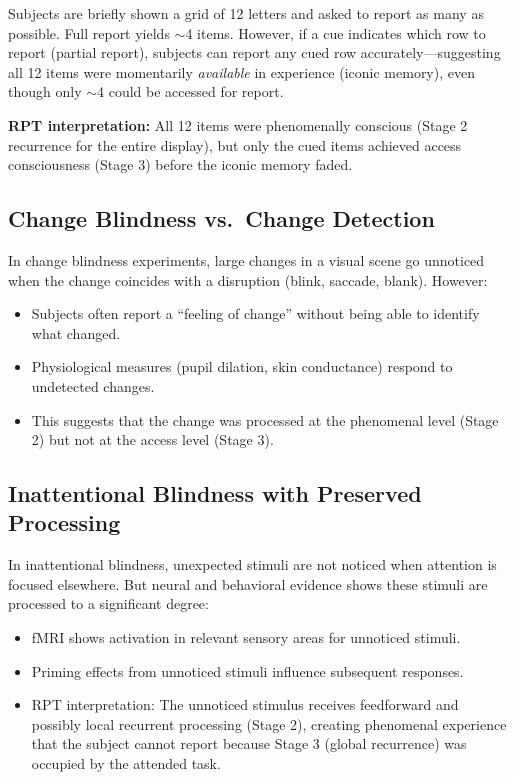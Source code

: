 \documentclass[11pt,a4paper]{report}
\begin{document}
\begin{examplebox}
Subjects are briefly shown a grid of 12 letters and asked to report as many as possible. Full report yields $\sim$4 items. However, if a cue indicates which row to report (partial report), subjects can report any cued row accurately---suggesting all 12 items were momentarily \emph{available} in experience (iconic memory), even though only $\sim$4 could be accessed for report.

\textbf{RPT interpretation:} All 12 items were phenomenally conscious (Stage 2 recurrence for the entire display), but only the cued items achieved access consciousness (Stage 3) before the iconic memory faded.
\end{examplebox}

\subsection{Change Blindness vs.\ Change Detection}

In change blindness experiments, large changes in a visual scene go unnoticed when the change coincides with a disruption (blink, saccade, blank). However:
\begin{itemize}[leftmargin=1.5em]
  \item Subjects often report a ``feeling of change'' without being able to identify what changed.
  \item Physiological measures (pupil dilation, skin conductance) respond to undetected changes.
  \item This suggests that the change was processed at the phenomenal level (Stage 2) but not at the access level (Stage 3).
\end{itemize}

\subsection{Inattentional Blindness with Preserved Processing}

In inattentional blindness, unexpected stimuli are not noticed when attention is focused elsewhere. But neural and behavioral evidence shows these stimuli are processed to a significant degree:
\begin{itemize}[leftmargin=1.5em]
  \item fMRI shows activation in relevant sensory areas for unnoticed stimuli.
  \item Priming effects from unnoticed stimuli influence subsequent responses.
  \item RPT interpretation: The unnoticed stimulus receives feedforward and possibly local recurrent processing (Stage 2), creating phenomenal experience that the subject cannot report because Stage 3 (global recurrence) was occupied by the attended task.
\end{itemize}
\end{document}
